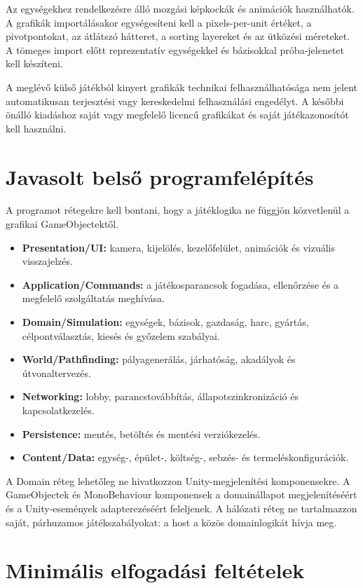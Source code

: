 \documentclass[12pt,a4paper]{article}
\begin{document}
Az egységekhez rendelkezésre álló mozgási képkockák és animációk használhatók. A grafikák importálásakor egységesíteni kell a pixels-per-unit értéket, a pivotpontokat, az átlátszó hátteret, a sorting layereket és az ütközési méreteket. A tömeges import előtt reprezentatív egységekkel és bázisokkal próba-jelenetet kell készíteni.

A meglévő külső játékból kinyert grafikák technikai felhasználhatósága nem jelent automatikusan terjesztési vagy kereskedelmi felhasználási engedélyt. A későbbi önálló kiadáshoz saját vagy megfelelő licencű grafikákat és saját játékazonosítót kell használni.

\section{Javasolt belső programfelépítés}

A programot rétegekre kell bontani, hogy a játéklogika ne függjön közvetlenül a grafikai GameObjectektől.

\begin{itemize}
  \item \textbf{Presentation/UI:} kamera, kijelölés, kezelőfelület, animációk és vizuális visszajelzés.
  \item \textbf{Application/Commands:} a játékosparancsok fogadása, ellenőrzése és a megfelelő szolgáltatás meghívása.
  \item \textbf{Domain/Simulation:} egységek, bázisok, gazdaság, harc, gyártás, célpontválasztás, kiesés és győzelem szabályai.
  \item \textbf{World/Pathfinding:} pályagenerálás, járhatóság, akadályok és útvonaltervezés.
  \item \textbf{Networking:} lobby, parancstovábbítás, állapotszinkronizáció és kapcsolatkezelés.
  \item \textbf{Persistence:} mentés, betöltés és mentési verziókezelés.
  \item \textbf{Content/Data:} egység-, épület-, költség-, sebzés- és termeléskonfigurációk.
\end{itemize}

A Domain réteg lehetőleg ne hivatkozzon Unity-megjelenítési komponensekre. A GameObjectek és MonoBehaviour komponensek a domainállapot megjelenítéséért és a Unity-események adapterezéséért feleljenek. A hálózati réteg ne tartalmazzon saját, párhuzamos játékszabályokat: a host a közös domainlogikát hívja meg.

\section{Minimális elfogadási feltételek}
\end{document}
